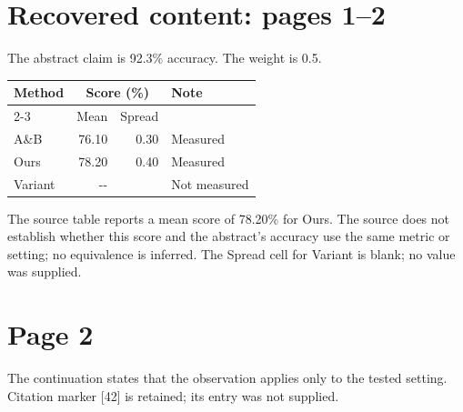 \documentclass{article}
\begin{document}
\section*{Recovered content: pages 1--2}
The abstract claim is 92.3\% accuracy. The weight is 0.5.
\begin{center}
\begin{tabular}{lrrl}
\toprule
Method & \multicolumn{2}{c}{Score (\%)} & Note \\
\cmidrule(lr){2-3}
 & Mean & Spread & \\
\midrule
A\&B & 76.10 & 0.30 & Measured \\
Ours & 78.20 & 0.40 & Measured \\
Variant & -{}- & & Not measured \\
\bottomrule
\end{tabular}
\end{center}
The source table reports a mean score of 78.20\% for Ours.
The source does not establish whether this score and the abstract's accuracy
use the same metric or setting; no equivalence is inferred.
The Spread cell for Variant is blank; no value was supplied.
\par{}
\section*{Page 2}
The continuation states that the observation applies only to the tested setting.
Citation marker [42] is retained; its entry was not supplied.
\end{document}
